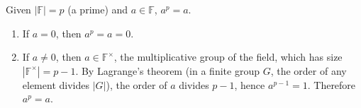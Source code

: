 \begin{tcolorbox}[title={\textbf{\tboxtheorem{\ref*{subsec:order-theorem}.4} Fermat's Little Theorem}}]
Given $|\mathbb{F}| = p$ (a prime) and $a \in \mathbb{F}$, $a^p = a$.
\end{tcolorbox}
\begin{myproof}
    \begin{enumerate}
    \item If $a=0$, then $a^p=a=0$.
    \item If $a\ne 0$, then $a \in \mathbb{F}^{\times}$, the multiplicative group of the field, which has size $|\mathbb{F}^{\times}|=p-1$.
    By Lagrange's theorem (in a finite group $G$, the order of any element divides $|G|$), the order of $a$ divides $p-1$, hence $a^{p-1}=1$. Therefore $a^p=a$.
    \end{enumerate}
\end{myproof}
